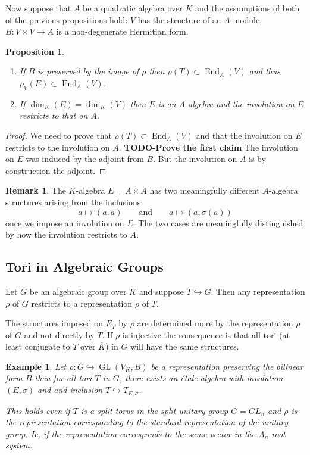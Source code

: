 \documentclass{article}
\theoremstyle{plain}
\newtheorem{proposition}[theorem]{Proposition}
\newtheorem{example}[theorem]{Example}
\theoremstyle{definition}
\newtheorem{remark}[theorem]{Remark}
\numberwithin{equation}{section}
\DeclareMathOperator{\End}{End}
\DeclareMathOperator{\GL}{GL}
\newcommand{\TODO}[1]{\textbf{TODO-#1}}
\begin{document}
Now suppose that $A$ be a quadratic algebra over $K$ and the assumptions of both of the previous propositions hold: $V$ has the structure of an $A$-module,  $B : V \times V \rightarrow A$ is a non-degenerate Hermitian form.

\begin{proposition}
\begin{enumerate}
\item If $B$ is preserved by the image of $\rho$ then $\rho(T) \subset \End_A(V)$ and thus $\rho_V(E) \subset \End_A(V)$.
\item If $\dim_K(E) = \dim_K(V)$ then $E$ is an $A$-algebra and the involution on $E$ restricts to that on $A$.
\end{enumerate}
\end{proposition}
\begin{proof}
We need to prove that $\rho(T) \subset \End_A(V)$ and that the involution on $E$ restricts to the involution on $A$.
\TODO{Prove the first claim}
The involution on $E$ was induced by the adjoint from $B$. But the involution on $A$ is by construction the adjoint.
\end{proof}
\begin{remark}
The $K$-algebra $E= A\times A$ has two meaningfully different $A$-algebra structures arising from the inclusions:
\[ a \mapsto (a,a) \qquad \text{and}\qquad a\mapsto (a,\sigma(a)) \]
once we impose an involution on $E$. The two cases are meaningfully distinguished by how the involution restricts to $A$.
\end{remark}


\subsection{Tori in Algebraic Groups}

Let $G$ be an algebraic group over $K$ and suppose $T \hookrightarrow G$.
Then any representation $\rho$ of $G$ restricts to a representation $\rho$ of $T$.

The structures imposed on $E_T$ by $\rho$ are determined more by the representation $\rho$ of $G$ and not directly by $T$. If $\rho$ is injective the consequence is that all tori (at least conjugate to $T$ over $\overline{K}$) in $G$ will have the same structures.

\begin{example}
Let $\rho:G \hookrightarrow \GL(V_K,B)$ be a representation preserving the bilinear form $B$ then for all tori $T$ in $G$, there exists an \'etale algebra with involution $(E,\sigma)$ and and inclusion $T \hookrightarrow T_{E,\sigma}$.

This holds even if $T$ is a split torus in the split unitary group $G=GL_n$ and $\rho$ is the representation corresponding to the standard representation of the unitary group. Ie, if the representation corresponds to the same vector in the $A_n$ root system.
\end{example}
\end{document}
